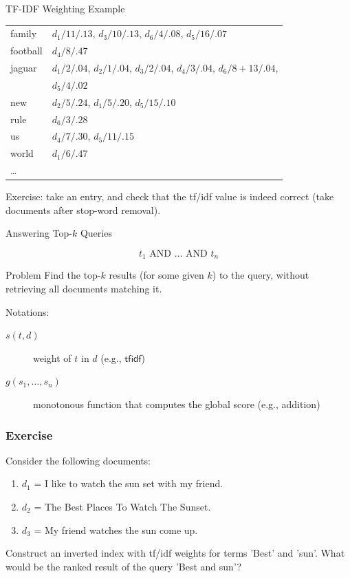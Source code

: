 \begin{frame}{TF-IDF Weighting Example}
\begin{tabular}{>{\color{structure.fg}}ll}
family&$d_1/11/.13$, $d_3/10/.13$, $d_6/4/.08$, $d_5/16/.07$\\
football&$d_4/8/.47$\\
jaguar&$d_1/2/.04$, $d_2/1/.04$, $d_3/2/.04$, $d_4/3/.04$,
  $d_6/8+13/.04$,\\& $d_5/4/.02$\\
new&$d_2/5/.24$, $d_1/5/.20$, $d_5/15/.10$\\
rule&$d_6/3/.28$\\
us&$d_4/7/.30$, $d_5/11/.15$\\
world&$d_1/6/.47$\\
\ldots
\end{tabular}

Exercise: take an entry, and check that the tf/idf value is indeed correct
(take documents after stop-word removal).

\end{frame}


\begin{frame}{Answering Top-$k$ Queries}

 \[t_1\text{ AND }\dots\text{ AND }t_n\]

\begin{beamerboxesrounded}{Problem}
Find the \alert{top-$k$ results} (for some given $k$) 
to the query, without retrieving all documents
matching it.
\end{beamerboxesrounded}

\vspace{.5cm}

Notations:
\begin{description}
\item[$s(t,d)$] weight of $t$ in $d$ (e.g., $\mathsf{tf{}idf}$)
\item[$g(s_1,\dots,s_n)$] monotonous function that computes the global
score (e.g., addition)
\end{description}
\end{frame}



\begin{frame}[fragile]
\frametitle{Exercise}
Consider the following documents:
\begin{enumerate}
  \item $d_1$ = I like to watch the sun set with my friend.
  \item $d_2$ = The Best Places To Watch The Sunset.
  \item $d_3$ = My friend watches the sun come up.
\end{enumerate}

Construct an inverted index with tf/idf weights for terms 'Best' and 'sun'. What
would be the ranked result of the query 'Best and sun'?

\end{frame}

